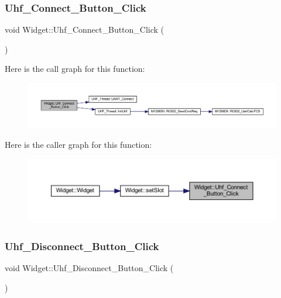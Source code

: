 \subsubsection{\texorpdfstring{Uhf\_Connect\_Button\_Click}{Uhf\_Connect\_Button\_Click}}
{\footnotesize\ttfamily void Widget\+::\+Uhf\+\_\+\+Connect\+\_\+\+Button\+\_\+\+Click (\begin{DoxyParamCaption}{ }\end{DoxyParamCaption})\hspace{0.3cm}{\ttfamily [slot]}}

Here is the call graph for this function\+:
\nopagebreak
\begin{figure}[H]
\begin{center}
\leavevmode
\includegraphics[width=350pt]{class_widget_acceb5443a97ee9023250cda33f183bef_cgraph}
\end{center}
\end{figure}
Here is the caller graph for this function\+:
\nopagebreak
\begin{figure}[H]
\begin{center}
\leavevmode
\includegraphics[width=350pt]{class_widget_acceb5443a97ee9023250cda33f183bef_icgraph}
\end{center}
\end{figure}
\mbox{\label{class_widget_a0186f9125495a90a0166280d932ae831}} 
\subsubsection{\texorpdfstring{Uhf\_Disconnect\_Button\_Click}{Uhf\_Disconnect\_Button\_Click}}
{\footnotesize\ttfamily void Widget\+::\+Uhf\+\_\+\+Disconnect\+\_\+\+Button\+\_\+\+Click (\begin{DoxyParamCaption}{ }\end{DoxyParamCaption})\hspace{0.3cm}{\ttfamily [slot]}}

